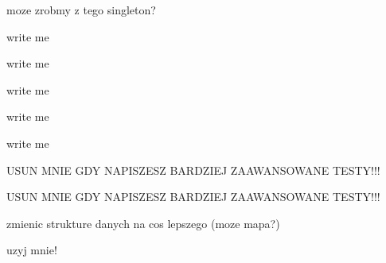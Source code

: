 
\begin{DoxyRefList}
\item[\label{todo__todo000001}%
\hypertarget{todo__todo000001}{}%
Klasa \hyperlink{structConfig}{Config} ]moze zrobmy z tego singleton?  
\item[\label{todo__todo000002}%
\hypertarget{todo__todo000002}{}%
Składowa \hyperlink{classCreature_a85b135bb56773ebd20a30e7efc216a47}{Creature\-:\-:Creature} (const \hyperlink{classCreature}{Creature} \&mother, const \hyperlink{classCreature}{Creature} \&father)]write me  
\item[\label{todo__todo000003}%
\hypertarget{todo__todo000003}{}%
Składowa \hyperlink{classCreature_ab7aded4b4eee101b224e50985ca6d08d}{Creature\-:\-:Creature} (double x\-\_\-pos, double y\-\_\-pos)]write me  
\item[\label{todo__todo000004}%
\hypertarget{todo__todo000004}{}%
Składowa \hyperlink{classCreature_ab4019c0b7940cd1b9fb19bf3399348ce}{Creature\-:\-:is\-Dead} () const ]write me  
\item[\label{todo__todo000005}%
\hypertarget{todo__todo000005}{}%
Klasa \hyperlink{classHerbivore}{Herbivore} ]write me  
\item[\label{todo__todo000006}%
\hypertarget{todo__todo000006}{}%
Klasa \hyperlink{classMap}{Map} ]write me  
\item[\label{todo__todo000008}%
\hypertarget{todo__todo000008}{}%
Składowa \hyperlink{classMap_ade3f961a8981ef66c159f968e4f98eb4}{Map\-:\-:count\-Objects} ()]U\-S\-U\-N M\-N\-I\-E G\-D\-Y N\-A\-P\-I\-S\-Z\-E\-S\-Z B\-A\-R\-D\-Z\-I\-E\-J Z\-A\-A\-W\-A\-N\-S\-O\-W\-A\-N\-E T\-E\-S\-T\-Y!!!  
\item[\label{todo__todo000007}%
\hypertarget{todo__todo000007}{}%
Składowa \hyperlink{classMap_a2ea398c824a67d162ce4017b9173d685}{Map\-:\-:create\-Some\-Random\-Objects} ()]U\-S\-U\-N M\-N\-I\-E G\-D\-Y N\-A\-P\-I\-S\-Z\-E\-S\-Z B\-A\-R\-D\-Z\-I\-E\-J Z\-A\-A\-W\-A\-N\-S\-O\-W\-A\-N\-E T\-E\-S\-T\-Y!!!  
\item[\label{todo__todo000009}%
\hypertarget{todo__todo000009}{}%
Składowa \hyperlink{classMap_a77f2877faf3096da591f2e2d17d92a25}{Map\-:\-:objects} ]zmienic strukture danych na cos lepszego (moze mapa?)  
\item[\label{todo__todo000010}%
\hypertarget{todo__todo000010}{}%
Składowa \hyperlink{classMap_a247075c0c8b390cdd3afab8f627d1e8d}{Map\-:\-:serialize} (Archive \&ar, const unsigned int version)]uzyj mnie! 
\end{DoxyRefList}